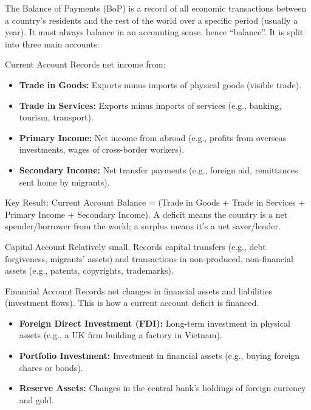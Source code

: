 \documentclass[11pt, a4paper, twoside]{book}
\begin{document}
The Balance of Payments (BoP) is a record of all economic transactions between a country's residents and the rest of the world over a specific period (usually a year). It must always balance in an accounting sense, hence ``balance''. It is split into three main accounts:

\begin{keyterm}{Current Account}
Records net income from:
\begin{itemize}
  \item \textbf{Trade in Goods:} Exports minus imports of physical goods (visible trade).
  \item \textbf{Trade in Services:} Exports minus imports of services (e.g., banking, tourism, transport).
  \item \textbf{Primary Income:} Net income from abroad (e.g., profits from overseas investments, wages of cross-border workers).
  \item \textbf{Secondary Income:} Net transfer payments (e.g., foreign aid, remittances sent home by migrants).
\end{itemize}
Key Result: Current Account Balance = (Trade in Goods + Trade in Services + Primary Income + Secondary Income). A deficit means the country is a net spender/borrower from the world; a surplus means it's a net saver/lender.
\end{keyterm}

\begin{keyterm}{Capital Account}
Relatively small. Records capital transfers (e.g., debt forgiveness, migrants' assets) and transactions in non-produced, non-financial assets (e.g., patents, copyrights, trademarks).
\end{keyterm}

\begin{keyterm}{Financial Account}
Records net changes in financial assets and liabilities (investment flows). This is how a current account deficit is financed.
\begin{itemize}
  \item \textbf{Foreign Direct Investment (FDI):} Long-term investment in physical assets (e.g., a UK firm building a factory in Vietnam).
  \item \textbf{Portfolio Investment:} Investment in financial assets (e.g., buying foreign shares or bonds).
  \item \textbf{Reserve Assets:} Changes in the central bank's holdings of foreign currency and gold.
\end{itemize}
\end{keyterm}
\end{document}
